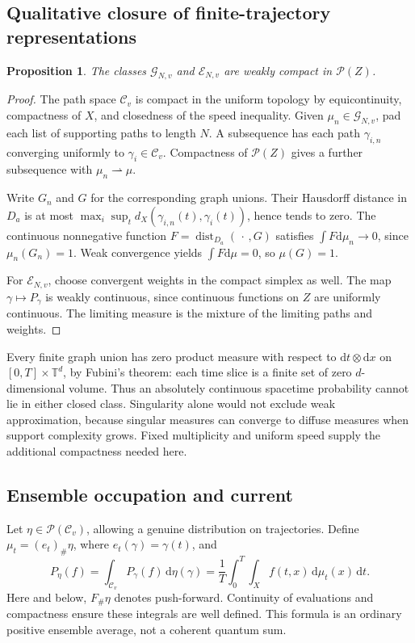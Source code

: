 \documentclass[aip,jmp,reprint,onecolumn,amsmath,amssymb]{revtex4-2}
\newcommand{\dd}{\mathrm{d}}
\newcommand{\T}{\mathbb T}
\newcommand{\Pp}{\mathcal P}
\newcommand{\C}{\mathcal C}
\newcommand{\G}{\mathcal G}
\newcommand{\dist}{\operatorname{dist}}
\newcommand{\push}{\mathord\#}
\newtheorem{proposition}[theorem]{Proposition}
\theoremstyle{definition}
\begin{document}
\subsection{Qualitative closure of finite-trajectory representations}
\begin{proposition}
The classes $\G_{N,v}$ and $\mathcal E_{N,v}$ are weakly compact in $\Pp(Z)$.
\end{proposition}
\begin{proof}
The path space $\C_v$ is compact in the uniform topology by equicontinuity, compactness of $X$, and closedness of the speed inequality. Given $\mu_n\in\G_{N,v}$, pad each list of supporting paths to length $N$. A subsequence has each path $\gamma_{i,n}$ converging uniformly to $\gamma_i\in\C_v$. Compactness of $\Pp(Z)$ gives a further subsequence with $\mu_n\rightharpoonup\mu$.

Write $G_n$ and $G$ for the corresponding graph unions. Their Hausdorff distance in $D_a$ is at most $\max_i\sup_t d_X(\gamma_{i,n}(t),\gamma_i(t))$, hence tends to zero. The continuous nonnegative function $F=\dist_{D_a}(\,\cdot\,,G)$ satisfies $\int F\dd\mu_n\to0$, since $\mu_n(G_n)=1$. Weak convergence yields $\int F\dd\mu=0$, so $\mu(G)=1$.

For $\mathcal E_{N,v}$, choose convergent weights in the compact simplex as well. The map $\gamma\mapsto P_\gamma$ is weakly continuous, since continuous functions on $Z$ are uniformly continuous. The limiting measure is the mixture of the limiting paths and weights.
\end{proof}
Every finite graph union has zero product measure with respect to $\dd t\otimes\dd x$ on $[0,T]\times\T^d$, by Fubini's theorem: each time slice is a finite set of zero $d$-dimensional volume. Thus an absolutely continuous spacetime probability cannot lie in either closed class. Singularity alone would not exclude weak approximation, because singular measures can converge to diffuse measures when support complexity grows. Fixed multiplicity and uniform speed supply the additional compactness needed here.

\subsection{Ensemble occupation and current}
Let $\eta\in\Pp(\C_v)$, allowing a genuine distribution on trajectories. Define $\mu_t=(e_t)_{\push}\eta$, where $e_t(\gamma)=\gamma(t)$, and
\begin{equation}
 P_\eta(f)=\int_{\C_v}P_\gamma(f)\,\dd\eta(\gamma)
 =\frac1T\int_0^T\int_X f(t,x)\,\dd\mu_t(x)\,\dd t.
 \label{eq:ensemble}
\end{equation}
Here and below, $F_{\push}\eta$ denotes push-forward. Continuity of evaluations and compactness ensure these integrals are well defined. This formula is an ordinary positive ensemble average, not a coherent quantum sum.
\end{document}
